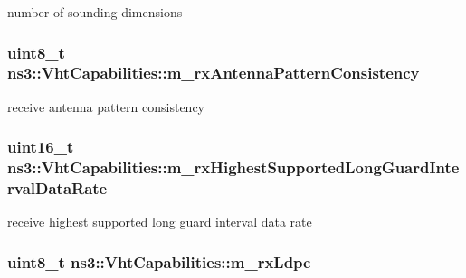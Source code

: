 number of sounding dimensions 

\subsubsection[{\texorpdfstring{m\+\_\+rx\+Antenna\+Pattern\+Consistency}{m_rxAntennaPatternConsistency}}]{\setlength{\rightskip}{0pt plus 5cm}uint8\+\_\+t ns3\+::\+Vht\+Capabilities\+::m\+\_\+rx\+Antenna\+Pattern\+Consistency\hspace{0.3cm}{\ttfamily [private]}}\hypertarget{classns3_1_1VhtCapabilities_abfe153a6daae103951c55c3f33d34886}{}\label{classns3_1_1VhtCapabilities_abfe153a6daae103951c55c3f33d34886}


receive antenna pattern consistency 

\subsubsection[{\texorpdfstring{m\+\_\+rx\+Highest\+Supported\+Long\+Guard\+Interval\+Data\+Rate}{m_rxHighestSupportedLongGuardIntervalDataRate}}]{\setlength{\rightskip}{0pt plus 5cm}uint16\+\_\+t ns3\+::\+Vht\+Capabilities\+::m\+\_\+rx\+Highest\+Supported\+Long\+Guard\+Interval\+Data\+Rate\hspace{0.3cm}{\ttfamily [private]}}\hypertarget{classns3_1_1VhtCapabilities_a8eefa16f2276c67de17edf74266c4b46}{}\label{classns3_1_1VhtCapabilities_a8eefa16f2276c67de17edf74266c4b46}


receive highest supported long guard interval data rate 

\subsubsection[{\texorpdfstring{m\+\_\+rx\+Ldpc}{m_rxLdpc}}]{\setlength{\rightskip}{0pt plus 5cm}uint8\+\_\+t ns3\+::\+Vht\+Capabilities\+::m\+\_\+rx\+Ldpc\hspace{0.3cm}{\ttfamily [private]}}\hypertarget{classns3_1_1VhtCapabilities_ac7538c76efb246f9c076a69d605c8d65}{}\label{classns3_1_1VhtCapabilities_ac7538c76efb246f9c076a69d605c8d65}


